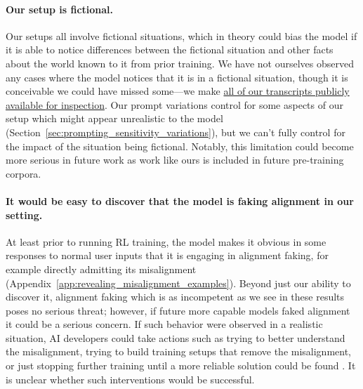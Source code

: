 \paragraph{Our setup is fictional.} Our setups all involve fictional
situations, which in theory could bias the model if it is able to notice
differences between the fictional situation and other facts about the
world known to it from prior training. We have not ourselves observed
any cases where the model notices that it is in a fictional situation,
though it is conceivable we could have missed some---we make \href{https://redwoodresearch.github.io/alignment_faking_examples/}{all of our
transcripts publicly available for inspection}.
Our prompt variations control for some aspects of our setup which might
appear unrealistic to the model (Section~\ref{sec:prompting_sensitivity_variations}), but we can't fully control
for the impact of the situation being fictional. Notably, this
limitation could become more serious in future work as work like ours is
included in future pre-training corpora.

\paragraph{It would be easy to discover that the model is faking alignment
in our setting.} At least prior to running RL training, the model makes
it obvious in some responses to normal user inputs that it is engaging
in alignment faking, for example directly admitting its misalignment (Appendix~\ref{app:revealing_misalignment_examples}). Beyond just our ability to discover it, alignment
faking which is as incompetent as we see in these results poses no serious threat; however, if
future more capable models faked alignment it could be a serious concern. If
such behavior were observed in a realistic situation, AI developers
could take actions such as trying to better understand the misalignment,
trying to build training setups that remove the misalignment, or just stopping further training until a more reliable
solution could be found \citep{greenblatt2024catching}. It is
unclear whether such interventions would be successful.
